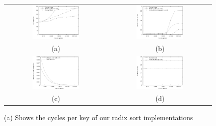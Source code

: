 \documentclass[acmtocl]{acmtrans2m}
\begin{document}
\begin{figure}
\centering
\begin{tabular}{cc}
\includegraphics[width=0.48\textwidth]{plots/radix_cycles.eps} & \includegraphics[width=0.48\textwidth]{plots/radix_versus_quick_level_2_misses.eps} \\
(a) & (b) \\
\includegraphics[width=0.48\textwidth]{plots/radix_branch_misses.eps} & \includegraphics[width=0.48\textwidth]{plots/radix_branches.eps} \\
(c) & (d) \\
\end{tabular}
\caption{(a) Shows the cycles per key of our radix sort implementations
}
\end{figure}
\end{document}
